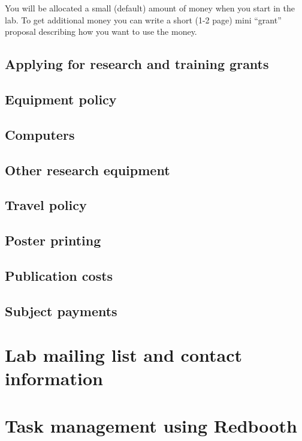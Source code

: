 \documentclass{tufte-book} %
\begin{document}
You will be allocated a small (default) amount of money when you start
in the lab.  To get additional money you can write a short (1-2 page)
mini ``grant'' proposal describing how you want to use the money.


 \subsection{Applying for research and training grants}

 \subsection{Equipment policy}
 \subsection{Computers}
 \subsection{Other research equipment}

 \subsection{Travel policy}

 \subsection{Poster printing}

 \subsection{Publication costs}

 \subsection{Subject payments}





 \section{Lab mailing list and contact information}

\section{Task management using Redbooth}
\end{document}
